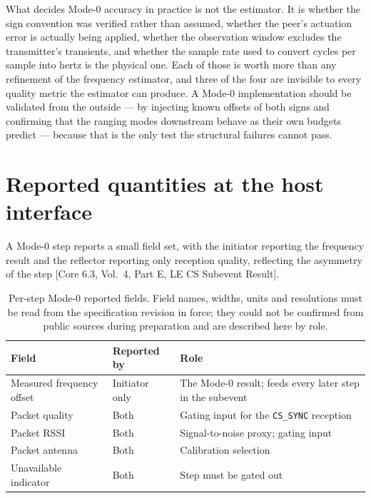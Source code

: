 \documentclass[11pt,a4paper]{article}
\newcommand{\code}[1]{\texttt{\small #1}}
\newcommand{\core}[1]{\textcolor{rulegrey}{\small[Core 6.3, #1]}}
\begin{document}
What decides Mode-0 accuracy in practice is not the estimator. It is whether the sign convention was
verified rather than assumed, whether the peer's actuation error is actually being applied, whether
the observation window excludes the transmitter's transients, and whether the sample rate used to
convert cycles per sample into hertz is the physical one. Each of those is worth more than any
refinement of the frequency estimator, and three of the four are invisible to every quality metric the
estimator can produce. A Mode-0 implementation should be validated from the outside --- by injecting
known offsets of both signs and confirming that the ranging modes downstream behave as their own
budgets predict --- because that is the only test the structural failures cannot pass.

\appendix
\section{Reported quantities at the host interface}
\label{app:hci}

A Mode-0 step reports a small field set, with the initiator reporting the frequency result and the
reflector reporting only reception quality, reflecting the asymmetry of the step
\core{Vol.\ 4, Part E, LE CS Subevent Result}.

\begin{table}[h]
\caption{Per-step Mode-0 reported fields. Field names, widths, units and resolutions must be read
from the specification revision in force; they could not be confirmed from public sources during
preparation and are described here by role.}
\label{tab:hci}
\centering\small
\begin{tabular}{@{}L{40mm}L{30mm}L{54mm}@{}}
\toprule
Field & Reported by & Role \\
\midrule
Measured frequency offset & Initiator only & The Mode-0 result; feeds every later step in the subevent \\
Packet quality & Both & Gating input for the \code{CS\_SYNC} reception \\
Packet RSSI & Both & Signal-to-noise proxy; gating input \\
Packet antenna & Both & Calibration selection \\
Unavailable indicator & Both & Step must be gated out \\
\bottomrule
\end{tabular}
\end{table}
\end{document}
